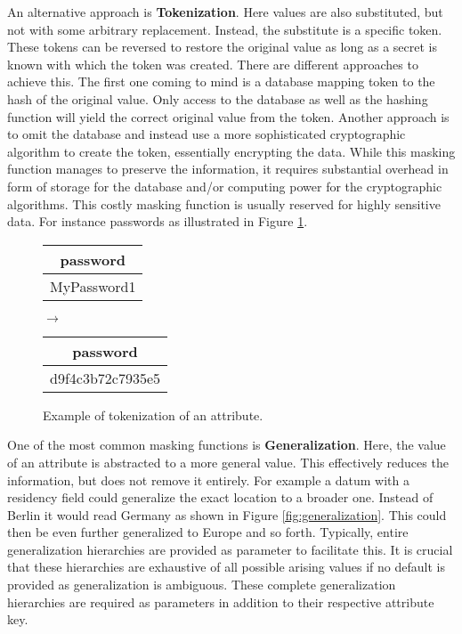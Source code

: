 An alternative approach is \textbf{Tokenization}. Here values are also substituted, but not with some arbitrary replacement. Instead, the substitute is a specific token. These tokens can be reversed to restore the original value as long as a secret is known with which the token was created. There are different approaches to achieve this. The first one coming to mind is a database mapping token to the hash of the original value. Only access to the database as well as the hashing function will yield the correct original value from the token. Another approach is to omit the database and instead use a more sophisticated cryptographic algorithm to create the token, essentially encrypting the data. While this masking function manages to preserve the information, it requires substantial overhead in form of storage for the database and/or computing power for the cryptographic algorithms. This costly masking function is usually reserved for highly sensitive data. For instance passwords as illustrated in Figure \ref{fig:tokenization}.

\bigskip

\begin{figure}[ht]
    \begin{center}
    \footnotesize{
        \renewcommand{\arraystretch}{1.5}
        \begin{tabular}{|c|}
            \hline
            password \\
            \hline
            MyPassword1 \\
            \hline
            \end{tabular}
            \quad $\longrightarrow$ \quad
            \begin{tabular}{|c|}
            \hline
            password \\
            \hline
            d9f4c3b72c7935e5 \\
            \hline
        \end{tabular}
    }
    \end{center}
    \caption{Example of tokenization of an attribute.\label{fig:tokenization}}
\end{figure}

One of the most common masking functions is \textbf{Generalization}. Here, the value of an attribute is abstracted to a more general value. This effectively reduces the information, but does not remove it entirely. For example a datum with a residency field could generalize the exact location to a broader one. Instead of Berlin it would read Germany as shown in Figure \ref{fig:generalization}. This could then be even further generalized to Europe and so forth. Typically, entire generalization hierarchies are provided as parameter to facilitate this. It is crucial that these hierarchies are exhaustive of all possible arising values if no default is provided as generalization is ambiguous. These complete generalization hierarchies are required as parameters in addition to their respective attribute key. 

